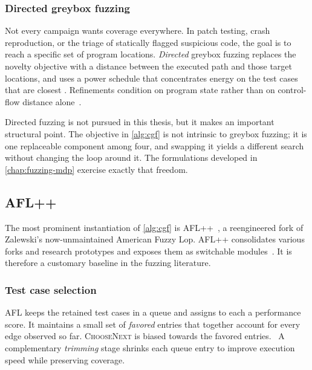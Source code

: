\subsubsection{Directed greybox fuzzing}

Not every campaign wants coverage everywhere.
In patch testing, crash reproduction, or the triage of statically flagged suspicious code,
the goal is to reach a specific set of program locations.
\emph{Directed} greybox fuzzing replaces the novelty objective with a distance between the
executed path and those target locations, and uses a power schedule that concentrates
energy on the test cases that are closest .
Refinements condition on program state rather than on control-flow distance
alone~\cite{chen_critical_nodate}.

Directed fuzzing is not pursued in this thesis, but it makes an important structural point.
The objective in \cref{alg:cgf} is not intrinsic to greybox fuzzing; it is one replaceable
component among four, and swapping it yields a different search without changing the loop
around it.
The formulations developed in \cref{chap:fuzzing-mdp} exercise exactly that freedom.

\subsection{AFL++}\label{sec:fuzzing-aflpp}

The most prominent instantiation of \cref{alg:cgf} is
AFL++~\cite{fioraldi_afl_nodate}, a reengineered fork of Zalewski's
now-unmaintained American Fuzzy Lop.
AFL++ consolidates various forks and research prototypes and exposes them as switchable modules~\cite{fioraldi_afl_nodate}.
It is therefore a customary baseline in the fuzzing literature.

\subsubsection{Test case selection}

AFL keeps the retained test cases in a queue and assigns to each a performance score.
It maintains a small set of \emph{favored} entries that together account for every edge observed so far.
\textsc{ChooseNext} is biased towards the favored entries.~\cite{fioraldi_afl_nodate}
A complementary \emph{trimming} stage shrinks each queue entry to improve execution speed while preserving coverage.


